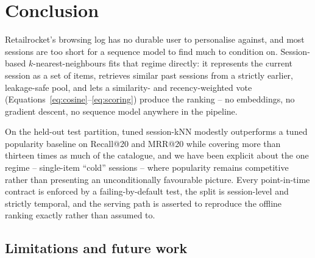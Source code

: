 \section{Conclusion}
\label{sec:conclusion}

Retailrocket's browsing log has no durable user to personalise against, and
most sessions are too short for a sequence model to find much to condition
on. Session-based $k$-nearest-neighbours fits that regime directly: it
represents the current session as a set of items, retrieves similar past
sessions from a strictly earlier, leakage-safe pool, and lets a
similarity- and recency-weighted vote (Equations~\ref{eq:cosine}--\ref{eq:scoring})
produce the ranking -- no embeddings, no gradient descent, no sequence model
anywhere in the pipeline.

On the held-out test partition, tuned session-kNN modestly outperforms a
tuned popularity baseline on Recall@20 and MRR@20 while covering more than
thirteen times as much of the catalogue, and we have been explicit about the
one regime -- single-item ``cold'' sessions -- where popularity remains
competitive rather than presenting an unconditionally favourable picture.
Every point-in-time contract is enforced by a failing-by-default test, the
split is session-level and strictly temporal, and the serving path is
asserted to reproduce the offline ranking exactly rather than assumed to.

\subsection{Limitations and future work}

